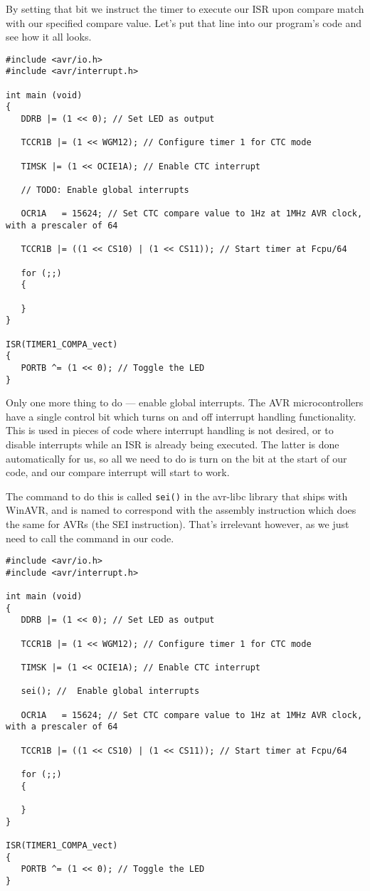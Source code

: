 \documentclass[a4paper,oneside,notitlepage]{book}
\begin{document}
By setting that bit we instruct the timer to execute our ISR upon compare match with our specified compare value. Let's put that line into our program's code and see how it all looks.

\begin{center}
\begin{lstlisting}
#include <avr/io.h>
#include <avr/interrupt.h>

int main (void)
{
   DDRB |= (1 << 0); // Set LED as output

   TCCR1B |= (1 << WGM12); // Configure timer 1 for CTC mode

   TIMSK |= (1 << OCIE1A); // Enable CTC interrupt

   // TODO: Enable global interrupts

   OCR1A   = 15624; // Set CTC compare value to 1Hz at 1MHz AVR clock, with a prescaler of 64

   TCCR1B |= ((1 << CS10) | (1 << CS11)); // Start timer at Fcpu/64

   for (;;)
   {

   }
}

ISR(TIMER1_COMPA_vect)
{
   PORTB ^= (1 << 0); // Toggle the LED
}
\end{lstlisting}
\end{center}

Only one more thing to do --- enable global interrupts. The AVR microcontrollers have a single control bit which turns on and off interrupt handling functionality. This is used in pieces of code where interrupt handling is not desired, or to disable interrupts while an ISR is already being executed. The latter is done automatically for us, so all we need to do is turn on the bit at the start of our code, and our compare interrupt will start to work.

The command to do this is called \texttt{sei()} in the avr-libc library that ships with WinAVR, and is named to correspond with the assembly instruction which does the same for AVRs (the SEI instruction). That's irrelevant however, as we just need to call the command in our code.

\begin{center}
\begin{lstlisting}
#include <avr/io.h>
#include <avr/interrupt.h>

int main (void)
{
   DDRB |= (1 << 0); // Set LED as output

   TCCR1B |= (1 << WGM12); // Configure timer 1 for CTC mode

   TIMSK |= (1 << OCIE1A); // Enable CTC interrupt

   sei(); //  Enable global interrupts

   OCR1A   = 15624; // Set CTC compare value to 1Hz at 1MHz AVR clock, with a prescaler of 64

   TCCR1B |= ((1 << CS10) | (1 << CS11)); // Start timer at Fcpu/64

   for (;;)
   {

   }
}

ISR(TIMER1_COMPA_vect)
{
   PORTB ^= (1 << 0); // Toggle the LED
}
\end{lstlisting}
\end{center}
\end{document}
